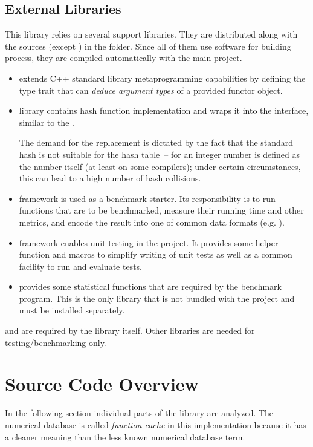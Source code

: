 \subsection{External Libraries}
This library relies on several support libraries. They are distributed along with the sources (except ) in the  folder. Since all of them use  software for building process, they are compiled automatically with the main project.
\begin{itemize}[leftmargin=2cm]
\item [\libname{function\_traits}] extends C++ standard library metaprogramming capabilities by defining the type trait that can \emph{deduce argument types} of a provided functor object.
\item [\libname{murmurhash2functor}] library contains  hash function\cite{murmurhash} implementation and wraps it into the interface, similar to the .

         The demand for the  replacement is dictated by the fact that the standard hash is not suitable for the hash table~--  for an integer number is defined as the number itself (at least on some compilers\cite{std_hash}); under certain circumstances, this can lead to a high number of hash collisions.
\item [\libname{Google Benchmark}] framework is used as a benchmark starter. Its responsibility is to run functions that are to be benchmarked, measure their running time and other metrics, and encode the result into one of common data formats (e.g. ).
\item [\libname{Google Test}] framework enables unit testing in the project. It provides some helper function and macros to simplify writing of unit tests as well as a common facility to run and evaluate tests.
\item [\libname{Boost.Math}] provides some statistical functions that are required by the benchmark program. This is the only library that is not bundled with the project and must be installed separately.
\end{itemize}
 and  are required by the library itself. Other libraries are needed for testing/benchmarking only.

\section{Source Code Overview}
In the following section individual parts of the library are analyzed. The numerical database is called \emph{function cache} in this implementation because it has a cleaner meaning than the less known numerical database term.

